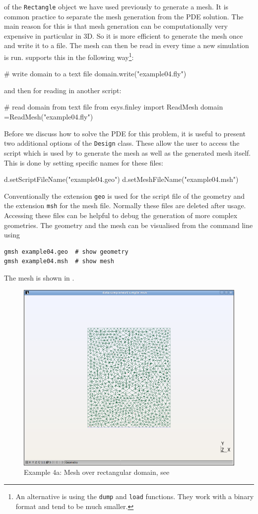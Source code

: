 of the \verb|Rectangle| object we have used previously to generate a mesh. It
is common practice to separate the mesh generation from the PDE solution.
The main reason for this is that mesh generation can be computationally very
expensive in particular in 3D. So it is more efficient to generate the mesh
once and write it to a file. The mesh can then be read in every time a new
simulation is run. \FINLEY supports this in the following 
way\footnote{An alternative is using the \texttt{dump} and \texttt{load}
functions. They work with a binary format and tend to be much smaller.}:
\begin{python}
# write domain to a text file
domain.write("example04.fly")
\end{python}
and then for reading in another script:
\begin{python}
# read domain from text file
from esys.finley import ReadMesh
domain =ReadMesh("example04.fly")
\end{python}

Before we discuss how to solve the PDE for this problem, it is useful to
present two additional options of the \verb|Design| class. 
These allow the user to access the script which is used by \gmsh to generate
the mesh as well as the generated mesh itself. This is done by setting specific
names for these files: 
\begin{python}
d.setScriptFileName("example04.geo")
d.setMeshFileName("example04.msh")
\end{python}
Conventionally the extension \texttt{geo} is used for the script file of the
\gmsh geometry and the extension \texttt{msh} for the mesh file. Normally these
files are deleted after usage.
Accessing these files can be helpful to debug the generation of more complex
geometries. The geometry and the mesh can be visualised from the command line
using
\begin{verbatim}
gmsh example04.geo  # show geometry
gmsh example04.msh  # show mesh
\end{verbatim}
The mesh is shown in .

\begin{figure}[ht]
\centerline{\includegraphics[width=4.in]{figures/simplemesh}}
\caption{Example 4a: Mesh over rectangular domain, see }
\label{fig:pycad rec mesh}
\end{figure}
\clearpage

